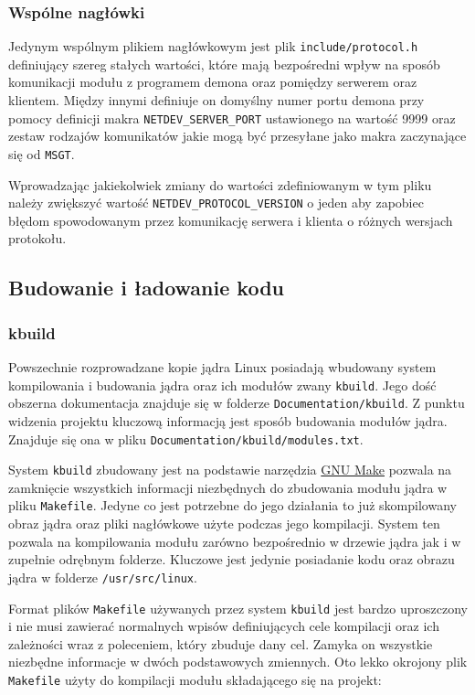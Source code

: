 \subsubsection{Wspólne nagłówki}

Jedynym wspólnym plikiem nagłówkowym jest plik
\texttt{include/protocol.h} definiujący szereg stałych wartości, które
mają bezpośredni wpływ na sposób komunikacji modułu z programem demona
oraz pomiędzy serwerem oraz klientem. Między innymi definiuje on
domyślny numer portu demona przy pomocy definicji makra
\texttt{NETDEV\_SERVER\_PORT} ustawionego na wartość 9999 oraz zestaw
rodzajów komunikatów jakie mogą być przesyłane jako makra zaczynające
się od \texttt{MSGT}.

Wprowadzając jakiekolwiek zmiany do wartości zdefiniowanym w tym pliku
należy zwiększyć wartość \texttt{NETDEV\_PROTOCOL\_VERSION} o jeden aby
zapobiec błędom spowodowanym przez komunikację serwera i klienta o
różnych wersjach protokołu.

\subsection{Budowanie i ładowanie kodu}

\subsubsection{kbuild}

Powszechnie rozprowadzane kopie jądra Linux posiadają wbudowany system
kompilowania i budowania jądra oraz ich modułów zwany \texttt{kbuild}.
Jego dość obszerna dokumentacja znajduje się w folderze
\texttt{Documentation/kbuild}. Z punktu widzenia projektu kluczową
informacją jest sposób budowania modułów jądra. Znajduje się ona w pliku
\texttt{Documentation/kbuild/modules.txt}.

System \texttt{kbuild} zbudowany jest na podstawie narzędzia
\href{https://www.gnu.org/software/make/}{GNU Make} pozwala na
zamknięcie wszystkich informacji niezbędnych do zbudowania modułu jądra
w pliku \texttt{Makefile}. Jedyne co jest potrzebne do jego działania to
już skompilowany obraz jądra oraz pliki nagłówkowe użyte podczas jego
kompilacji. System ten pozwala na kompilowania modułu zarówno
bezpośrednio w drzewie jądra jak i w zupełnie odrębnym folderze.
Kluczowe jest jedynie posiadanie kodu oraz obrazu jądra w folderze
\texttt{/usr/src/linux}.

Format plików \texttt{Makefile} używanych przez system \texttt{kbuild}
jest bardzo uproszczony i nie musi zawierać normalnych wpisów
definiujących cele kompilacji oraz ich zależności wraz z poleceniem,
który zbuduje dany cel. Zamyka on wszystkie niezbędne informacje w dwóch
podstawowych zmiennych. Oto lekko okrojony plik \texttt{Makefile} użyty
do kompilacji modułu składającego się na projekt:

